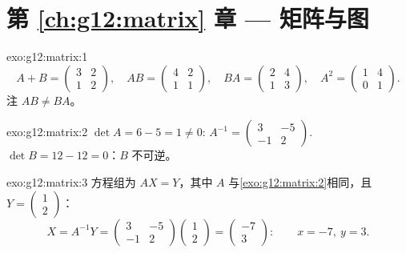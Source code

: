\section*{第 \ref{ch:g12:matrix} 章 --- 矩阵与图}

\begin{solution}{exo:g12:matrix:1}
\[
A + B = \begin{pmatrix} 3 & 2\\ 1 & 2\end{pmatrix}, \quad
AB = \begin{pmatrix} 4 & 2\\ 1 & 1\end{pmatrix}, \quad
BA = \begin{pmatrix} 2 & 4\\ 1 & 3\end{pmatrix}, \quad
A^2 = \begin{pmatrix} 1 & 4\\ 0 & 1\end{pmatrix}.
\]
注 $AB \neq BA$。
\end{solution}

\begin{solution}{exo:g12:matrix:2}
$\det A = 6 - 5 = 1 \neq 0$:
$A^{-1} = \begin{pmatrix} 3 & -5\\ -1 & 2 \end{pmatrix}$.
$\det B = 12 - 12 = 0$：$B$ 不可逆。
\end{solution}

\begin{solution}{exo:g12:matrix:3}
方程组为 $AX = Y$，其中 $A$ 与\cref{exo:g12:matrix:2}相同，且
$Y = \begin{pmatrix} 1\\ 2\end{pmatrix}$：
\[
X = A^{-1}Y = \begin{pmatrix} 3 & -5\\ -1 & 2\end{pmatrix}
\begin{pmatrix} 1\\ 2\end{pmatrix}
= \begin{pmatrix} -7\\ 3\end{pmatrix}:
\qquad x = -7,\ y = 3 .
\]
\end{solution}

